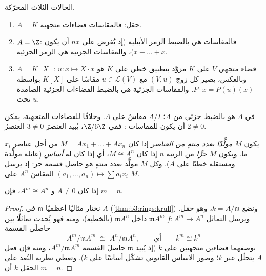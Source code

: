 \begin{example}\label{ex:b3:modules:examples}
الحالات الثلاث المحرّكة.
\begin{enumerate}
  \item $A = K$ حقل: فالمقاسات فضاءات متجهية.
  \item $A = \Z$: فالمقاسات هي بالضبط الزمر الأبيلية (إذ يُفرض
        على $nx$ أن يكون $x + \dots + x$)، والمقاسات الجزئية هي
        الزمر الجزئية.
  \item $A = K[X]$:  فضاء متجهي $V$ على $K$ مزوَّد بتطبيق
        خطي على $K$ هو $u\colon x \mapsto X\cdot x$ --- وبالعكس، يصير كل زوج $(V, u)$
        مع $u \in \mathcal L(V)$ مقاسًا على $K[X]$ بواسطة $P \cdot x = P(u)(x)$. والمقاسات
        الجزئية هي بالضبط الفضاءات الجزئية الصامدة تحت $u$.
\end{enumerate}
 في $A$ هو بالضبط  جزئي من $A$؛  $A/I$
مقاسٌ على $A$. وخلافًا للفضاءات المتجهية، يمكن أن يكون للمقاسات
\emph{}: ففي $\Z/6\Z$، يُبيد العنصرَ $\bar 3 \ne 0$ العنصرُ
$2 \neq 0$.
\end{example}

\begin{definition}\label{def:b3:modules:free}
يكون $M$ \emph{مولَّدًا بعدد منتهٍ من العناصر} إذا كان $M = Ax_1 + \dots + Ax_n$ من أجل عناصر $x_i$ ما. ويكون $M$
\emph{حرًّا} من الرتبة $n$ إذا كان $M \cong A^n$، أي
إذا كان له \emph{أساس} (عائلة مولِّدة ومستقلة خطيًا على $A$). وكل
 $M$ مولَّد بعدد منتهٍ هو حاصل قسمة  حر: إذ يرسل $(a_1, \dots, a_n) \mapsto \sum a_ix_i$
المقاسَ $A^n$ على $M$.
\end{definition}

\begin{proposition}\label{prop:b3:modules:rank}
إذا كان $A \neq 0$ و $A^m \cong A^n$، فإن $m = n$.
\end{proposition}

\begin{proof}
نختار مثاليًا أعظميًا $\mathfrak m$ في $A$ (\cref{thm:b3:rings:krull}) ونضع
$k = A/\mathfrak m$، وهو حقل. ويرسل التماثل $f \colon A^m
\to A^n$  $\mathfrak m A^m$ داخل $\mathfrak m A^n$
(بالخطية)، ومنه فهو يُحدث تماثلًا بين حاصلَي القسمة
\[
A^m/\mathfrak m A^m \;\cong\; A^n/\mathfrak m A^n,
\qquad\text{أي}\qquad k^m \cong k^n
\]
بوصفهما فضاءين متجهيين على $k$ (إذ يُبيد $\mathfrak m$ حاصلَ
القسمة $A^m/\mathfrak m A^m$، ومنه فإن فعل $A$ يتحلّل عبر $k$؛ وصور الأساس
القانوني تشكّل أساسًا على $k$). وتعطي نظرية البُعد على الحقل $k$
أن $m = n$.
\end{proof}


